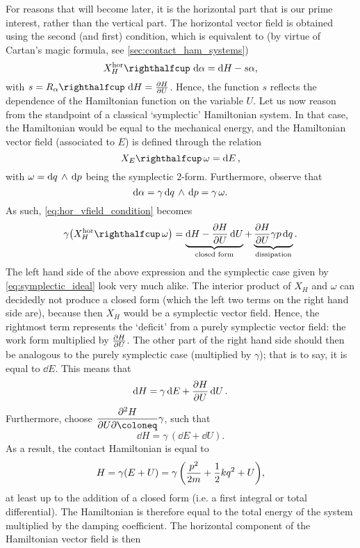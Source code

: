 For reasons that will become later, it is the horizontal part that is our prime interest, rather than the vertical part. The horizontal vector field is obtained using the second (and first) condition, which is equivalent to (by virtue of Cartan's magic formula, see \cref{sec:contact_ham_systems})
\begin{equation}
    \intpr{X_H^\text{hor}}{\dd{\alpha}} = \dd{H} - s \alpha, 
    \label{eq:hor_vfield_condition}
\end{equation}
with $s = \intpr{R_\alpha}{\dd{H}} = \pdv{H}{U}$. Hence, the function $s$ reflects the dependence of the Hamiltonian function on the variable $U$. Let us now reason from the standpoint of a classical `symplectic' Hamiltonian system. In that case, the Hamiltonian would be equal to the mechanical energy, and the Hamiltonian vector field (associated to $E$) is defined through the relation
\begin{equation}
    \intpr{X_E}{\omega} = \dd{E}, 
    \label{eq:symplectic_ideal}
\end{equation}
with $\omega =  \dd{q}\,\wedge\,\dd{p} $ being the symplectic 2-form. Furthermore, observe that 
$$
    \dd{\alpha} = \gamma  \dd{q}\,\wedge\,\dd{p}  = \gamma\,\omega. 
$$
As such, \cref{eq:hor_vfield_condition} becomes
$$
    \gamma \qty( \intpr{X_H^\text{hor}}{\omega} ) = \underbrace{\dd{H} - \pdv{H}{U}\dd{U}}_\text{closed form} + \underbrace{\pdv{H}{U} \gamma p\dd{q}}_\text{dissipation}.
$$
The left hand side of the above expression and the symplectic case given by \cref{eq:symplectic_ideal} look very much alike. The interior product of $X_H$ and $\omega$ can decidedly not produce a closed form (which the left two terms on the right hand side are), because then $X_H$ would be a symplectic vector field. Hence, the rightmost term represents the `deficit' from a purely symplectic vector field: the work form multiplied by $\pdv{H}{U}$. The other part of the right hand side should then be analogous to the purely symplectic case (multiplied by $\gamma$); that is to say, it is equal to $\dd{E}$. This means that 
$$ \dd{H}  = \gamma \dd{E} + \pdv{H}{U}\dd{U}. $$
Furthermore, choose $ \displaystyle \pdv{H}{U} \coloneq \gamma $, such that
$$ \dd{H} = \gamma\,(\dd{E} + \dd{U}). $$
As a result, the contact Hamiltonian is equal to
\begin{equation}
    H = \gamma (E + U) = \gamma\,\qty(\frac{p^2}{2m} + \frac{1}{2}kq^2 + U), 
\end{equation}
at least up to the addition of a closed form (i.e. a first integral or total differential). The Hamiltonian is therefore equal to the total energy of the system multiplied by the damping coefficient. The horizontal component of the Hamiltonian vector field is then
